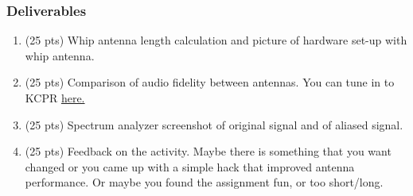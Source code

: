 \subsubsection{Deliverables}
\begin{enumerate}
    \item (25 pts) Whip antenna length calculation and picture of hardware set-up with whip antenna.
    \item (25 pts) Comparison of audio fidelity between antennas. You can tune in to KCPR \href{https://kcpr.org/}{here.}
    \item (25 pts) Spectrum analyzer screenshot of original signal and of aliased signal. 
    \item (25 pts) Feedback on the activity. Maybe there is something that you want changed or you came up with a simple hack that improved antenna performance. Or maybe you found the assignment fun, or too short/long.
\end{enumerate} 


